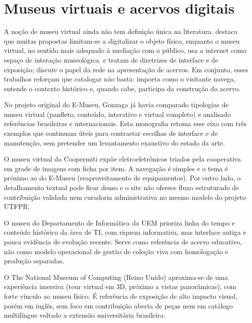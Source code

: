 \section{Museus virtuais e acervos digitais}\label{sec:trab-museus-virtuais}

A noção de museu virtual ainda não tem definição única na literatura.  destaca que muitas propostas limitam-se a digitalizar o objeto físico, enquanto o museu virtual, no sentido mais adequado à mediação com o público, usa a internet como espaço de interação museológica.  e  tratam de diretrizes de interface e de exposição;  discute o papel da rede na apresentação de acervos. Em conjunto, esses trabalhos reforçam que catalogar não basta: importa como o visitante navega, entende o contexto histórico e, quando cabe, participa da construção do acervo.

No projeto original do E-Museu, Gonzaga já havia comparado tipologias de museu virtual (panfleto, conteúdo, interativo e virtual completo) e analisado referências brasileiras e internacionais. Esta monografia retoma esse eixo com três exemplos que continuam úteis para contrastar escolhas de interface e de manutenção, sem pretender um levantamento exaustivo do estado da arte.

O museu virtual da Coopermiti \cite{coopermiti_museu} expõe eletroeletrônicos triados pela cooperativa em grade de imagens com ficha por item. A navegação é simples e o tema é próximo ao do E-Museu (reaproveitamento de equipamentos). Por outro lado, o detalhamento textual pode ficar denso e o site não oferece fluxo estruturado de contribuição validada nem curadoria administrativa no mesmo modelo do projeto UTFPR.

O museu do Departamento de Informática da UEM \cite{uem_museu} prioriza linha do tempo e conteúdo histórico da área de TI, com riqueza informativa, mas interface antiga e pouca evidência de evolução recente. Serve como referência de acervo educativo, não como modelo operacional de gestão de coleção viva com homologação e produção separadas.

O The National Museum of Computing (Reino Unido) \cite{tnmoc} aproxima-se de uma experiência imersiva (tour virtual em 3D, próximo a vistas panorâmicas), com forte vínculo ao museu físico. É referência de exposição de alto impacto visual, porém em inglês, sem foco em contribuição aberta de peças nem em catálogo multilíngue voltado a extensão universitária brasileira.

